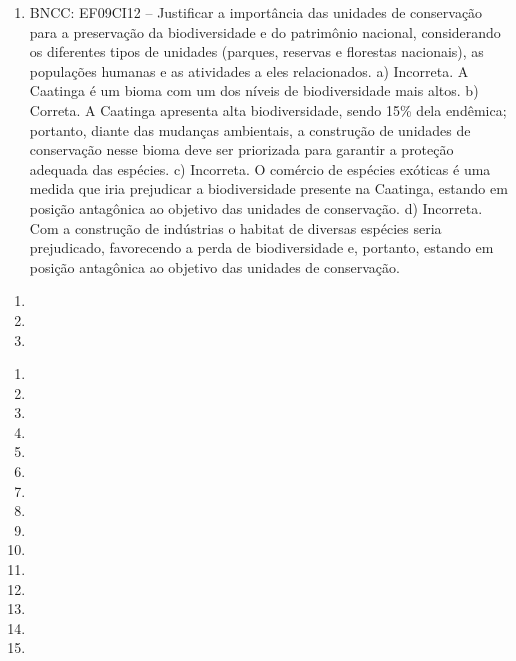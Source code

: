 \begin{enumerate}
\item
BNCC: EF09CI12 -- Justificar a importância das unidades de
conservação para a preservação da biodiversidade e do patrimônio
nacional, considerando os diferentes tipos de unidades (parques,
reservas e florestas nacionais), as populações humanas e as atividades a
eles relacionados.
a) Incorreta. A Caatinga é um bioma com um dos níveis de
  biodiversidade mais altos.
b) Correta. A Caatinga apresenta alta biodiversidade, sendo 15\% dela
  endêmica; portanto, diante das mudanças ambientais, a construção de
  unidades de conservação nesse bioma deve ser priorizada para garantir a proteção adequada das espécies.
c) Incorreta. O comércio de espécies exóticas é uma medida que iria
  prejudicar a biodiversidade presente na Caatinga, estando em posição
  antagônica ao objetivo das unidades de conservação.
d) Incorreta. Com a construção de indústrias o habitat de diversas
  espécies seria prejudicado, favorecendo a perda de biodiversidade e,
  portanto, estando em posição antagônica ao objetivo das unidades de conservação.
\end{enumerate}


\begin{enumerate}
\item

\item

\item
\end{enumerate}


\begin{enumerate}
\item
\item
\item
\item
\item
\item
\item
\item
\item
\item
\item
\item
\item
\item
\item
\end{enumerate}


